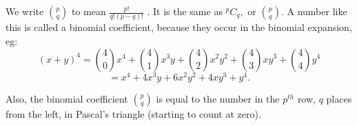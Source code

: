 We write $ {p \choose q} $ to mean $ \frac{p!}{q! (p-q)!} $ . It is
the same as $^{p}C_{q},$ or ${p \choose q}$. A number like this is
called a binomial coefficient, because they occur in the binomial
expansion, eg:
 \[ (x + y)^4 =  {4 \choose 0}  x^4 +  
{4 \choose 1}  x^3 y+  {4 \choose 2} 
 x^2 y^2 +  {4 \choose 3} 
xy^3 +  {4 \choose 4}  y^4 \] 
\[ = x^4 + 4 x^3 y + 6 x^2 y^2 +
 4 xy^3 + y^4. \]
\par
Also, the binomial coefficient $ {p \choose q} $ is equal to the
number in the $p^{th}$ row, $q$ places from the left, in Pascal's
triangle (starting to count at zero).